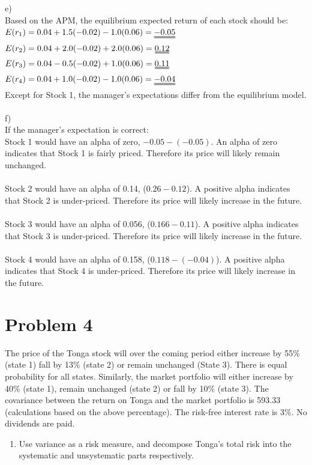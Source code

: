 \documentclass[12]{article}
\begin{document}
e)\\
Based on the APM, the equilibrium expected return of each stock should be:\\
$E(r_1) = 0.04 + 1.5(-0.02) - 1.0(0.06) = \uuline{-0.05}$\\
$E(r_2) = 0.04 + 2.0(-0.02) + 2.0(0.06) = \uuline{0.12}$\\
$E(r_3) = 0.04 - 0.5(-0.02) + 1.0(0.06) = \uuline{0.11}$\\
$E(r_4) = 0.04 + 1.0(-0.02) - 1.0(0.06) = \uuline{-0.04}$\\
Except for Stock 1, the manager's expectations differ from the equilibrium model.\\
\\
f)\\
If the manager's expectation is correct:\\
Stock 1 would have an alpha of zero, $-0.05 - (-0.05)$. An alpha of zero indicates that Stock 1 is fairly priced. Therefore its price will likely remain unchanged. \\
\\
Stock 2 would have an alpha of 0.14, ($0.26 - 0.12$). A positive alpha indicates that Stock 2 is under-priced. Therefore its price will likely increase in the future.\\
\\
Stock 3 would have an alpha of 0.056, ($0.166 - 0.11$). A positive alpha indicates that Stock 3 is under-priced. Therefore its price will likely increase in the future.\\
\\
Stock 4 would have an alpha of 0.158, ($0.118 - (-0.04)$). A positive alpha indicates that Stock 4 is under-priced. Therefore its price will likely increase in the future.\\





\color{black}
\section*{Problem 4}
The price of the Tonga stock will over the coming period either increase by 55\%(state 1) fall by 13\% (state 2) or remain unchanged (State 3). There is equal probability for all states. 
Similarly, the market portfolio will either increase by 40\% (state 1), remain unchanged (state 2) or fall by 10\% (state 3). The covariance between the return on Tonga and the market portfolio is 593.33 (calculations based on the above percentage). The risk-free interest rate is 3\%. No dividends are paid.
\begin{enumerate}
    \item[a)] Use variance as a risk measure, and decompose Tonga's total risk into the systematic and unsystematic parts respectively. 
\end{enumerate}
\end{document}
